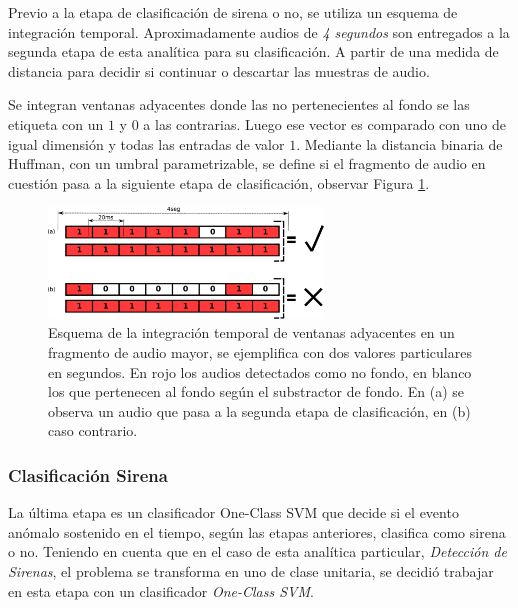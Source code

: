 \documentclass{article}
\begin{document}
Previo a la etapa de clasificación de sirena o no, se utiliza un esquema de integración temporal. Aproximadamente audios de \textit{4 segundos} son entregados a la segunda etapa de esta analítica para su clasificación.  A partir de una medida de distancia para decidir si continuar o descartar las muestras de audio.

\bigskip
Se integran ventanas adyacentes donde las no pertenecientes al fondo se las etiqueta con un $1$ y $0$ a las contrarias. Luego ese vector es comparado con uno de igual dimensión y todas las entradas de valor $1$. Mediante la distancia binaria de Huffman, con un umbral parametrizable, se define si el fragmento de audio en cuestión pasa a la siguiente etapa de clasificación, observar Figura \ref{fig:integracion_temporal}.  

\begin{figure}[h]
\begin{center}
\includegraphics[width=0.65\textwidth]{integracion_temporal} 
\caption{Esquema de la integración temporal de ventanas adyacentes en un fragmento de audio mayor, se ejemplifica con dos valores particulares en segundos. En rojo los audios detectados como no fondo, en blanco los que pertenecen al fondo según el substractor de fondo. En (a) se observa un audio que pasa a la segunda etapa de clasificación, en (b) caso contrario.}
\label{fig:integracion_temporal}
\end{center}
\end{figure}
 
\subsubsection{Clasificación Sirena}
\label{onesvmsirena}
La última etapa es un clasificador One-Class SVM que decide si el evento anómalo sostenido en el tiempo, según las etapas anteriores, clasifica como sirena o no. Teniendo en cuenta que en el caso de esta analítica particular, \textit{Detección de Sirenas}, el problema se transforma en uno de clase unitaria, se decidió trabajar en esta etapa con un clasificador \textit{One-Class SVM}. 
\end{document}
